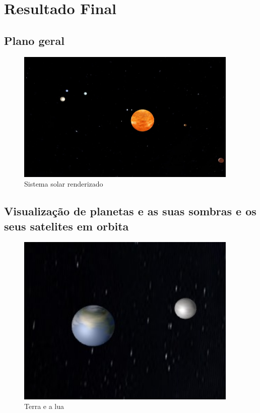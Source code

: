 \documentclass[12pt,a4paper]{memoir}
\begin{document}
\newpage

\section{Resultado Final}

\subsection{Plano geral}


\begin{figure}[!htb]
\centering
\includegraphics[width=300pt]{Sistema solar.jpg}
\caption{Sistema solar renderizado}
\end{figure}

\newpage

\subsection{Visualização de planetas e as suas sombras e os seus satelites em orbita}

\begin{figure}[!htb]
\centering
\includegraphics[width=300pt]{Terra.jpg}
\caption{Terra e a lua}
\end{figure}
\end{document}
